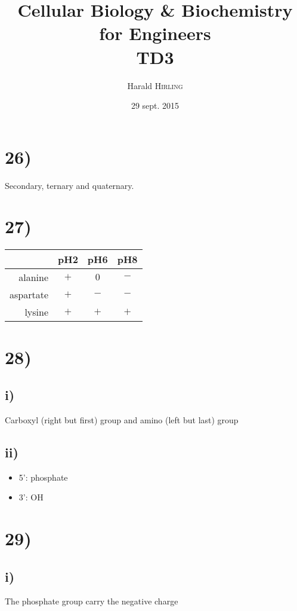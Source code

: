 

\title{Cellular Biology \& Biochemistry for Engineers\\TD3}
\author{Harald \textsc{Hirling}}
\date{29 sept. 2015}


\maketitle

\section*{26)}

Secondary, ternary and quaternary.

\section*{27)}

\begin{tabular}{r|ccc}
    & pH2 & pH6 & pH8\\
    \hline
    alanine & $+$ & $0$ & $-$ \\
    aspartate & $+$ & $-$ & $-$ \\
    lysine & $+$ & $+$ & $+$
\end{tabular}

\section*{28)}
    \subsection*{i)}
Carboxyl (right but first) group and amino (left but last) group

    \subsection*{ii)}
\begin{itemize}
    \item 5': phosphate
    \item 3': OH
\end{itemize}

\section*{29)}
    \subsection*{i)}
The phosphate group carry the negative charge

